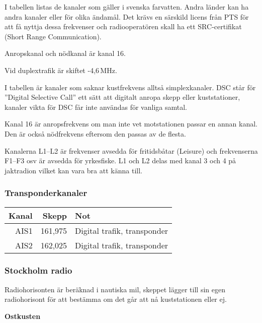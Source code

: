 I tabellen listas de kanaler som gäller i svenska farvatten. Andra
länder kan ha andra kanaler eller för olika ändamål. Det krävs en
särskild licens från PTS för att få nyttja dessa frekvenser och
radiooperatören skall ha ett SRC-certifikat (Short Range
Communication).

Anropskanal och nödkanal är kanal 16.

Vid duplextrafik är skiftet -4,6\,MHz.

I tabellen är kanaler som saknar kustfrekvens alltså
simplexkanaler. DSC står för ''Digital Selective Call'' ett sätt att
digitalt anropa skepp eller kuststationer, kanaler vikta för DSC får
inte användas för vanliga samtal.

Kanal 16 är anropsfrekvens om man inte vet motstationen passar en
annan kanal. Den är också nödfrekvens eftersom den passas av de
flesta.

Kanalerna L1--L2 är frekvenser avsedda för fritidsbåtar (Leisure) och
frekvenserna F1--F3 osv är avsedda för yrkesfiske. L1 och L2 delas med
kanal 3 och 4 på jaktradion vilket kan vara bra att känna till.

\subsubsection{Transponderkanaler}
\begin{longtable}{rrl}
	\textbf{Kanal} & \textbf{Skepp} & \textbf{Not} \\ \hline
	   \endhead
AIS1 & 161,975 & Digital trafik, transponder\\
AIS2 & 162,025 & Digital trafik, transponder\\
\end{longtable}

\subsubsection{Stockholm radio}

Radiohorisonten är beräknad i nautiska mil, skeppet lägger till sin egen radiohorisont för att bestämma om det går att nå kuststationen eller ej.

\textbf{Ostkusten}

